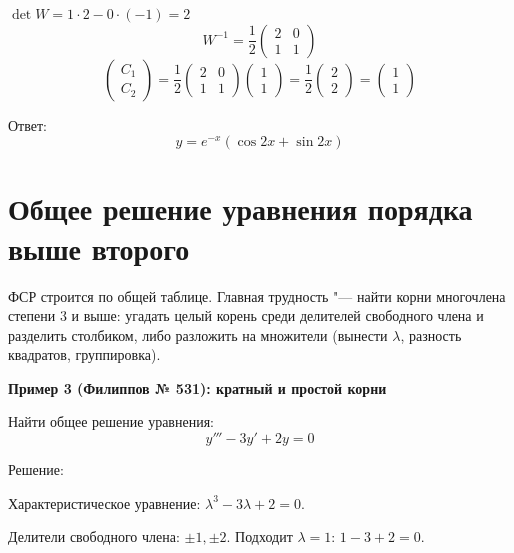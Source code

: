 \documentclass[11pt,a4paper]{article}
\newcommand{\example}[1]{\par\medskip\noindent\textbf{#1}\par\nopagebreak\smallskip}
\begin{document}
$\det W = 1 \cdot 2 - 0 \cdot (-1) = 2$
\[
  W^{-1} = \frac12 \begin{pmatrix} 2 & 0 \\ 1 & 1 \end{pmatrix}
\]
\[
  \begin{pmatrix} C_1 \\ C_2 \end{pmatrix}
  = \frac12 \begin{pmatrix} 2 & 0 \\ 1 & 1 \end{pmatrix} \begin{pmatrix} 1 \\ 1 \end{pmatrix}
  = \frac12 \begin{pmatrix} 2 \\ 2 \end{pmatrix}
  = \begin{pmatrix} 1 \\ 1 \end{pmatrix}
\]

Ответ:
\[
  y = e^{-x}(\cos 2x + \sin 2x)
\]

\section*{Общее решение уравнения порядка выше второго}

ФСР строится по общей таблице. Главная трудность "--- найти корни многочлена степени $3$ и выше: угадать целый корень среди делителей свободного члена и разделить столбиком, либо разложить на множители (вынести $\lambda$, разность квадратов, группировка).

\example{Пример 3 (Филиппов № 531): кратный и простой корни}

Найти общее решение уравнения:
\[
  y''' - 3y' + 2y = 0
\]

Решение:

Характеристическое уравнение: $\lambda^3 - 3\lambda + 2 = 0$.

Делители свободного члена: $\pm1, \pm2$. Подходит $\lambda = 1$: $1 - 3 + 2 = 0$.
\end{document}
